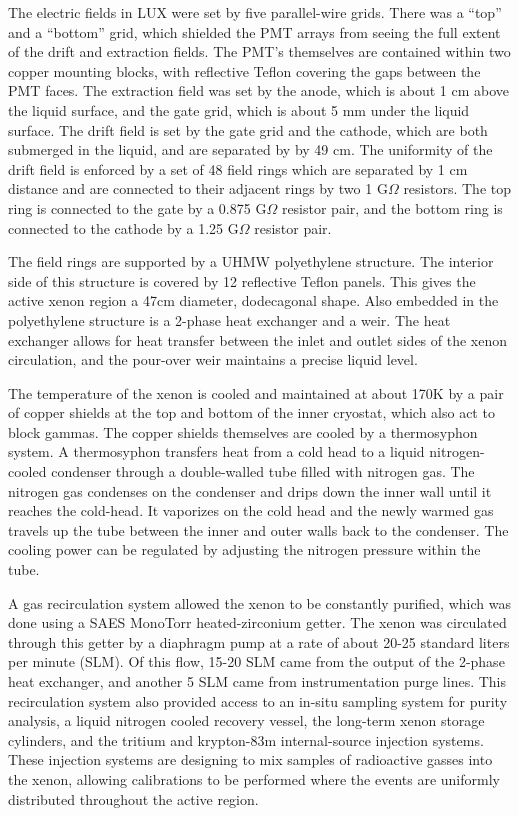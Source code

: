 The electric fields in LUX were set by five parallel-wire grids. There was a ``top'' and a ``bottom'' grid, which shielded the PMT arrays from seeing the full extent of the drift and extraction fields. The PMT's themselves are contained within two copper mounting blocks, with reflective Teflon covering the gaps between the PMT faces. The extraction field was set by the anode, which is about 1 cm above the liquid surface, and the gate grid, which is about 5 mm under the liquid surface. The drift field is set by the gate grid and the cathode, which are both submerged in the liquid, and are separated by by 49 cm. The uniformity of the drift field is enforced by a set of 48 field rings which are separated by 1 cm distance and are connected to their adjacent rings by two 1 G$\Omega$ resistors. The top ring is connected to the gate by a 0.875 G$\Omega$ resistor pair, and the bottom ring is connected to the cathode by a 1.25 G$\Omega$ resistor pair.

The field rings are supported by a UHMW polyethylene structure. The interior side of this structure is covered by 12 reflective Teflon panels. This gives the active xenon region a 47cm diameter, dodecagonal shape. Also embedded in the polyethylene structure is a 2-phase heat exchanger and a weir. The heat exchanger allows for heat transfer between the inlet and outlet sides of the xenon circulation, and the pour-over weir maintains a precise liquid level.

The temperature of the xenon is cooled and maintained at about 170K by a pair of copper shields at the top and bottom of the inner cryostat, which also act to block gammas. The copper shields themselves are cooled by a thermosyphon system\cite{thermosyphon}. A thermosyphon transfers heat from a cold head to a liquid nitrogen-cooled condenser through a double-walled tube filled with nitrogen gas. The nitrogen gas condenses on the condenser and drips down the inner wall until it reaches the cold-head. It vaporizes on the cold head and the newly warmed gas travels up the tube between the inner and outer walls back to the condenser. The cooling power can be regulated by adjusting the nitrogen pressure within the tube.

A gas recirculation system allowed the xenon to be constantly purified, which was done using a SAES
MonoTorr heated-zirconium getter\cite{getter}. The xenon was circulated through this getter by a diaphragm pump at a rate of about 20-25 standard liters per minute (SLM). Of this flow, 15-20 SLM came from the output of the 2-phase heat exchanger, and another 5 SLM came from instrumentation purge lines. This recirculation system also provided access to an in-situ sampling system for purity analysis, a liquid nitrogen cooled recovery vessel, the long-term xenon storage cylinders, and the tritium\cite{lux_tritium} and krypton-83m\cite{lux_kr1} internal-source injection systems. These injection systems are designing to mix samples of radioactive gasses into the xenon, allowing calibrations to be performed where the events are uniformly distributed throughout the active region.

